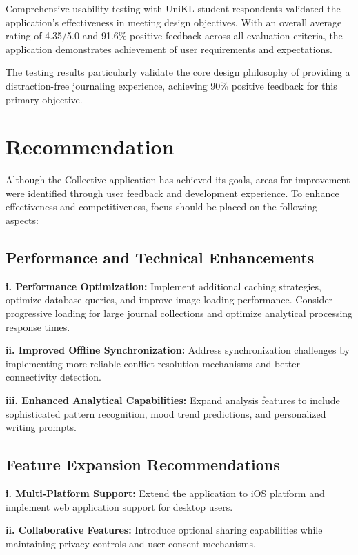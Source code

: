 Comprehensive usability testing with UniKL student respondents validated the application's effectiveness in meeting design objectives. With an overall average rating of 4.35/5.0 and 91.6\% positive feedback across all evaluation criteria, the application demonstrates achievement of user requirements and expectations.

The testing results particularly validate the core design philosophy of providing a distraction-free journaling experience, achieving 90\% positive feedback for this primary objective.

\section{Recommendation}\label{sec:recommendation}

Although the Collective application has achieved its goals, areas for improvement were identified through user feedback and development experience. To enhance effectiveness and competitiveness, focus should be placed on the following aspects:

\subsection{Performance and Technical Enhancements}

\textbf{i. Performance Optimization:} Implement additional caching strategies, optimize database queries, and improve image loading performance. Consider progressive loading for large journal collections and optimize analytical processing response times.

\textbf{ii. Improved Offline Synchronization:} Address synchronization challenges by implementing more reliable conflict resolution mechanisms and better connectivity detection.

\textbf{iii. Enhanced Analytical Capabilities:} Expand analysis features to include sophisticated pattern recognition, mood trend predictions, and personalized writing prompts.

\subsection{Feature Expansion Recommendations}

\textbf{i. Multi-Platform Support:} Extend the application to iOS platform and implement web application support for desktop users.

\textbf{ii. Collaborative Features:} Introduce optional sharing capabilities while maintaining privacy controls and user consent mechanisms.

